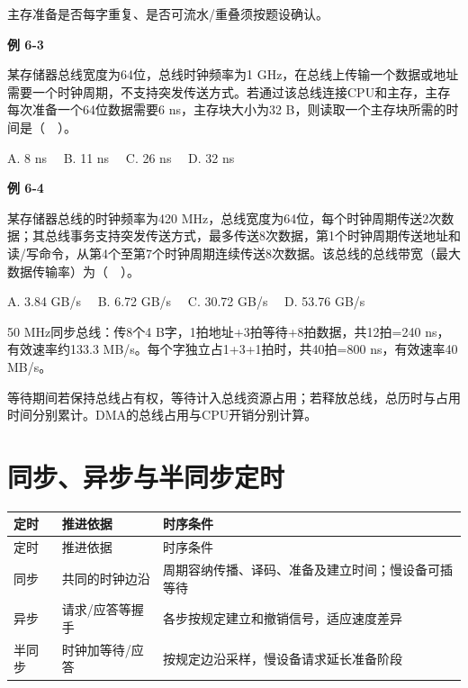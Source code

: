 主存准备是否每字重复、是否可流水/重叠须按题设确认。

\par\medskip{}\noindent\hypertarget{CO06-E03}{}\label{CO06-E03}\textbf{例 6-3}\par\nobreak\smallskip

某存储器总线宽度为64位，总线时钟频率为1 GHz，在总线上传输一个数据或地址需要一个时钟周期，不支持突发传送方式。若通过该总线连接CPU和主存，主存每次准备一个64位数据需要6 ns，主存块大小为32 B，则读取一个主存块所需的时间是（　）。

A. 8 ns　 B. 11 ns　 C. 26 ns　 D. 32 ns

\par\medskip{}\noindent\hypertarget{CO06-E04}{}\label{CO06-E04}\textbf{例 6-4}\par\nobreak\smallskip

某存储器总线的时钟频率为420 MHz，总线宽度为64位，每个时钟周期传送2次数据；其总线事务支持突发传送方式，最多传送8次数据，第1个时钟周期传送地址和读/写命令，从第4个至第7个时钟周期连续传送8次数据。该总线的总线带宽（最大数据传输率）为（　）。

A. 3.84 GB/s　 B. 6.72 GB/s　 C. 30.72 GB/s　 D. 53.76 GB/s

50 MHz同步总线：传8个4 B字，1拍地址+3拍等待+8拍数据，共12拍=240 ns，有效速率约133.3 MB/s。每个字独立占1+3+1拍时，共40拍=800 ns，有效速率40 MB/s。

等待期间若保持总线占有权，等待计入总线资源占用；若释放总线，总历时与占用时间分别累计。DMA的总线占用与CPU开销分别计算。

\section{同步、异步与半同步定时}\label{CO06-timing}

\par\smallskip
{\fontsize{9.3}{12}\selectfont\setlength{\tabcolsep}{2.5pt}\setlength{\LTleft}{0pt}\setlength{\LTright}{0pt}
\begin{longtable}{@{}>{\raggedright\arraybackslash}p{}>{\raggedright\arraybackslash}p{}>{\raggedright\arraybackslash}p{}@{}}
\toprule
定时 & 推进依据 & 时序条件 \\

\midrule\endfirsthead\toprule
定时 & 推进依据 & 时序条件 \\

\midrule\endhead\bottomrule\endfoot
同步 & 共同的时钟边沿 & 周期容纳传播、译码、准备及建立时间；慢设备可插等待 \\

异步 & 请求/应答等握手 & 各步按规定建立和撤销信号，适应速度差异 \\

半同步 & 时钟加等待/应答 & 按规定边沿采样，慢设备请求延长准备阶段 \\

\end{longtable}}
\par\smallskip

